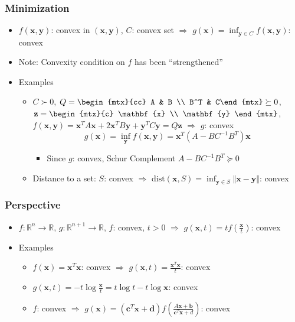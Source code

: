 \subsubsection*{Minimization}
\begin{itemize}
    \item $f(\mathbf{x}, \mathbf{y})$: convex in $(\mathbf{x}, \mathbf{y})$, $C$: convex set
        $\Rightarrow$ $g(\mathbf{x}) = \inf_{\mathbf{y} \in C} f(\mathbf{x}, \mathbf{y})$: convex
    \item Note: Convexity condition on $f$ has been ``strengthened''
    \item Examples
    \begin{itemize}
        \item $C \succ 0$, $Q = \begin{mtx}{cc} A & B \\ B^T & C\end{mtx} \succeq 0$,
            $\mathbf{z} = \begin{mtx}{c} \mathbf{x} \\ \mathbf{y} \end{mtx}$,
            $f(\mathbf{x}, \mathbf{y}) = \mathbf{x}^TA\mathbf{x} + 2\mathbf{x}^TB\mathbf{y} + \mathbf{y}^TC\mathbf{y} = Q\mathbf{z}$ $\Rightarrow$ $g$: convex
            $$ g(\mathbf{x}) = \inf_{\mathbf{y}} f(\mathbf{x}, \mathbf{y}) = \mathbf{x}^T (A - BC^{-1}B^T)\mathbf{x} $$
            \begin{itemize}
                \item Since $g$: convex, Schur Complement $A - BC^{-1}B^T \succeq 0$
            \end{itemize}
        \item Distance to a set: $S$: convex $\Rightarrow$
            $\mathrm{dist}(\mathbf{x}, S) = \inf_{\mathbf{y} \in S} \Vert \mathbf{x} - \mathbf{y} \Vert$: convex
    \end{itemize}
\end{itemize}

\subsubsection*{Perspective}
\begin{itemize}
    \item $f:\mathbb{R}^n \rightarrow \mathbb{R}$, $g:\mathbb{R}^{n+1} \rightarrow \mathbb{R}$,
        $f$: convex, $t>0$ $\Rightarrow$ $g(\mathbf{x}, t) = t f\left( \frac {\mathbf{x}} t \right)$: convex
    \item Examples
    \begin{itemize}
        \item $f(\mathbf{x}) = \mathbf{x}^T\mathbf{x}$: convex
            $\Rightarrow$ $g(\mathbf{x}, t) = \frac {\mathbf{x}^T\mathbf{x}} t$: convex
        \item $g(\mathbf{x}, t) = -t\log {\frac {\mathbf{x}} t} = t\log t - t\log \mathbf{x}$: convex
        \item $f$: convex $\Rightarrow$
            $g(\mathbf{x}) = \left(\mathbf{c}^T\mathbf{x} + \mathbf{d}\right) f \left( \frac {A\mathbf{x} + \mathbf{b}} {\mathbf{c}^T\mathbf{x} + d} \right)$: convex
    \end{itemize}
\end{itemize}

